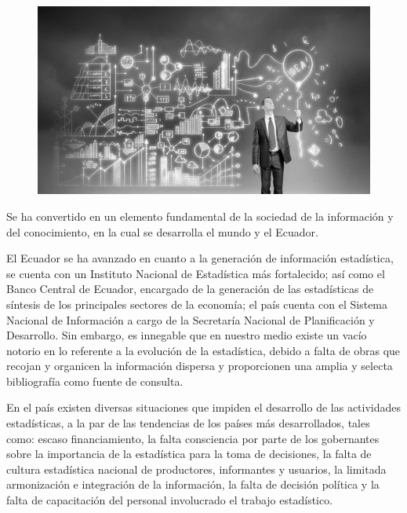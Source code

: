 \documentclass[a5paper,doc,10pt,noapacite]{apa6}
\begin{document}
{{\begin{figure} %
    \centering
    \includegraphics[scale=0.12]{Graficos/fig9_GC.jpg}
    \vspace{-1em}
\end{figure}

Se ha convertido en un elemento fundamental de la sociedad de la información y del conocimiento, en la cual se desarrolla el mundo y el Ecuador.

El Ecuador se ha avanzado en cuanto a la generación de información estadística, se cuenta con un Instituto Nacional de Estadística más fortalecido; así como el Banco Central de Ecuador, encargado de la generación de las estadísticas de síntesis de los principales sectores de la economía; el país cuenta con el Sistema Nacional de Información a cargo de la Secretaría Nacional de Planificación y Desarrollo. Sin embargo, es innegable que en nuestro medio existe un vacío notorio en lo referente a la evolución de la estadística, debido a falta de obras que recojan y organicen la información dispersa y proporcionen una amplia y selecta bibliografía como fuente de consulta.

\vspace{1\baselineskip}
En el país existen diversas situaciones que impiden el desarrollo de las actividades estadísticas, a la par de las tendencias de los países más desarrollados, tales como: escaso financiamiento, la falta consciencia por parte de los gobernantes sobre la importancia de la estadística para la toma de decisiones, la falta de cultura estadística nacional de productores, informantes y usuarios, la limitada armonización e integración de la información, la falta de decisión política y la falta de capacitación del personal involucrado el trabajo estadístico.

}}
\end{document}

